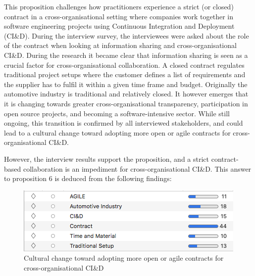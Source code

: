 This proposition challenges how practitioners experience a strict (or closed) contract in a cross-organisational setting where companies work together in software engineering projects using Continuous Integration and Deployment (CI\&D). During the interview survey, the interviewees were asked about the role of the contract when looking at information sharing and cross-organisational CI\&D. During the research it became clear that information sharing is seen as a crucial factor for cross-organisational collaboration. A closed contract regulates traditional project setups where the customer defines a list of requirements and the supplier has to fulfil it within a given time frame and budget. Originally the automotive industry is traditional and relatively closed. It however emerges that it is changing towards greater cross-organisational transparency, participation in open source projects, and becoming a software-intensive sector. While still ongoing, this transition is confirmed by all interviewed stakeholders, and could lead to a cultural change toward adopting more open or agile contracts for cross-organisational CI\&D.

However, the interview results support the proposition, and a strict contract-based collaboration is an impediment for cross-organisational CI\&D. This answer to proposition 6 is deduced from the following findings:

\begin{figure}[htb]
\centering
\includegraphics[width=\columnwidth]{figure/ss_CodeGroup6.png}
\caption{Cultural change toward adopting more open or agile contracts for cross-organisational CI\&D}
\label{fig:towardsAgile}
\end{figure}

